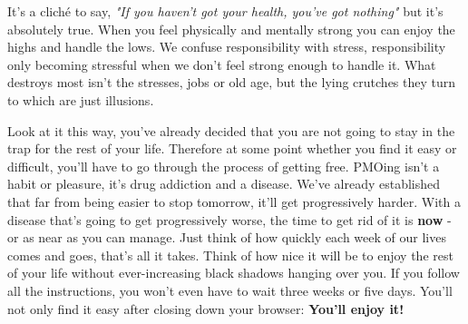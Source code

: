 \documentclass[easypeasy.tex]{subfiles}
\begin{document}
It's a cliché to say, \textit{"If you haven't got your health, you've got nothing"} but it's absolutely true. When you feel physically and mentally strong you can enjoy the highs and handle the lows. We confuse responsibility with stress, responsibility only becoming stressful when we don't feel strong enough to handle it. What destroys most isn't the stresses, jobs or old age, but the lying crutches they turn to which are just illusions.

Look at it this way, you've already decided that you are not going to stay in the trap for the rest of your life. Therefore at some point whether you find it easy or difficult, you'll have to go through the process of getting free. PMOing isn't a habit or pleasure, it's drug addiction and a disease. We've already established that far from being easier to stop tomorrow, it'll get progressively harder. With a disease that's going to get progressively worse, the time to get rid of it is \textbf{now} - or as near as you can manage. Just think of how quickly each week of our lives comes and goes, that's all it takes. Think of how nice it will be to enjoy the rest of your life without ever-increasing black shadows hanging over you. If you follow all the instructions, you won't even have to wait three weeks or five days. You'll not only find it easy after closing down your browser: \textbf{You'll enjoy it!}
\end{document}
